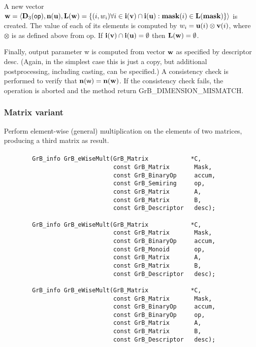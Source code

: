 A new vector ${\bf w} = \langle \bold{D}_3({\sf op}),
\bold{n}({\bf u}), \bold{L}({\bf w}) = \{(i,w_i)  \forall i \in
{\bf i}({\bf v}) \cap {\bf i}({\bf u}) : {\bf mask}(i)
\in \bold{L}({\bf mask}) \} \rangle$ is created.  The value of each of its
elements is computed by $w_i = {\bf u}(i) \otimes {\bf v}(i)$,
where $\otimes$ is as defined above from {\sf op}.
If ${\bf i}({\bf v}) \cap {\bf i}({\bf u}) = \emptyset$
then $\bold{L}({\bf w}) = \emptyset$.

Finally, output parameter {\sf w} is computed from vector ${\bf w}$
as specified by descriptor {\sf desc}. (Again, in the simplest case this
is just a copy, but additional postprocessing, including casting, can be specified.)  A consistency check is
performed to verify that $\bold{n}({\sf w}) = \bold{n}({\bf w})$. If
the consistency check fails, the operation is aborted and the method
return {\sf GrB\_DIMENSION\_MISMATCH}.


\subsubsection{Matrix variant}

Perform element-wise (general) multiplication on the elements of two matrices,
producing a third matrix as result.

\paragraph{\syntax}

\begin{verbatim}
        GrB_info GrB_eWiseMult(GrB_Matrix            *C,
                               const GrB_Matrix       Mask,
                               const GrB_BinaryOp     accum,
                               const GrB_Semiring     op, 
                               const GrB_Matrix       A,
                               const GrB_Matrix       B,
                               const GrB_Descriptor   desc);
                            
        GrB_info GrB_eWiseMult(GrB_Matrix            *C,
                               const GrB_Matrix       Mask,
                               const GrB_BinaryOp     accum,
                               const GrB_Monoid       op, 
                               const GrB_Matrix       A,
                               const GrB_Matrix       B,
                               const GrB_Descriptor   desc);
                            
        GrB_info GrB_eWiseMult(GrB_Matrix            *C,
                               const GrB_Matrix       Mask,
                               const GrB_BinaryOp     accum,
                               const GrB_BinaryOp     op, 
                               const GrB_Matrix       A,
                               const GrB_Matrix       B,
                               const GrB_Descriptor   desc);
\end{verbatim}

